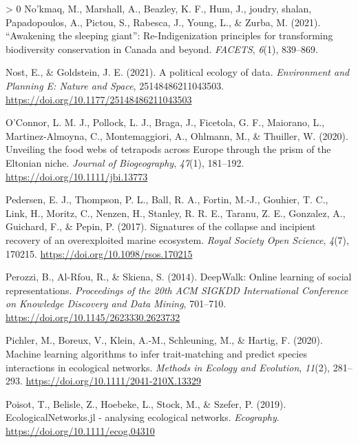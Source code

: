 \documentclass[11pt]{article}
\newlength{\cslhangindent}
\newenvironment{CSLReferences}[3] %
 {%
  \setlength{\parindent}{0pt}
  \ifodd #1 \everypar{\setlength{\hangindent}{\cslhangindent}}\ignorespaces\fi
  \ifnum #2 > 0
  \setlength{\parskip}{#2\baselineskip}
  \fi
 }%
 {}
\begin{document}
\begin{CSLReferences}{1}{0}
\leavevmode\hypertarget{ref-Nokmaq2021AwaSle}{}%
No'kmaq, M., Marshall, A., Beazley, K. F., Hum, J., joudry, shalan,
Papadopoulos, A., Pictou, S., Rabesca, J., Young, L., \& Zurba, M.
(2021). {``Awakening the sleeping giant''}: Re-Indigenization principles
for transforming biodiversity conservation in Canada and beyond.
\emph{FACETS}, \emph{6}(1), 839--869.

\leavevmode\hypertarget{ref-Nost2021PolEco}{}%
Nost, E., \& Goldstein, J. E. (2021). A political ecology of data.
\emph{Environment and Planning E: Nature and Space}, 25148486211043503.
\url{https://doi.org/10.1177/25148486211043503}

\leavevmode\hypertarget{ref-OConnor2020UnvFoo}{}%
O'Connor, L. M. J., Pollock, L. J., Braga, J., Ficetola, G. F.,
Maiorano, L., Martinez‐Almoyna, C., Montemaggiori, A., Ohlmann, M., \&
Thuiller, W. (2020). Unveiling the food webs of tetrapods across Europe
through the prism of the Eltonian niche. \emph{Journal of Biogeography},
\emph{47}(1), 181--192. \url{https://doi.org/10.1111/jbi.13773}

\leavevmode\hypertarget{ref-Pedersen2017SigCol}{}%
Pedersen, E. J., Thompson, P. L., Ball, R. A., Fortin, M.-J., Gouhier,
T. C., Link, H., Moritz, C., Nenzen, H., Stanley, R. R. E., Taranu, Z.
E., Gonzalez, A., Guichard, F., \& Pepin, P. (2017). Signatures of the
collapse and incipient recovery of an overexploited marine ecosystem.
\emph{Royal Society Open Science}, \emph{4}(7), 170215.
\url{https://doi.org/10.1098/rsos.170215}

\leavevmode\hypertarget{ref-Perozzi2014DeeOnl}{}%
Perozzi, B., Al-Rfou, R., \& Skiena, S. (2014). DeepWalk: Online
learning of social representations. \emph{Proceedings of the 20th ACM
SIGKDD International Conference on Knowledge Discovery and Data Mining},
701--710. \url{https://doi.org/10.1145/2623330.2623732}

\leavevmode\hypertarget{ref-Pichler2020MacLea}{}%
Pichler, M., Boreux, V., Klein, A.-M., Schleuning, M., \& Hartig, F.
(2020). Machine learning algorithms to infer trait-matching and predict
species interactions in ecological networks. \emph{Methods in Ecology
and Evolution}, \emph{11}(2), 281--293.
\url{https://doi.org/10.1111/2041-210X.13329}

\leavevmode\hypertarget{ref-Poisot2019EcoJl}{}%
Poisot, T., Belisle, Z., Hoebeke, L., Stock, M., \& Szefer, P. (2019).
EcologicalNetworks.jl - analysing ecological networks. \emph{Ecography}.
\url{https://doi.org/10.1111/ecog.04310}


\end{CSLReferences}
\end{document}
